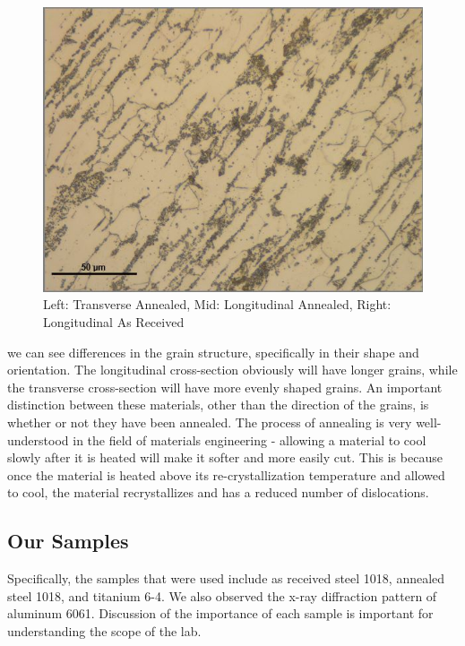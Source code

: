 \documentclass{article}
\begin{document}
\begin{figure}[h]
	\begin{minipage}{0.32\textwidth}
		\centering
		\includegraphics[scale=.28]{LongARSteel.png}
	\end{minipage}
	\caption{Left: Transverse Annealed, Mid: Longitudinal Annealed, Right: Longitudinal As Received}
\end{figure}

we can see differences in the grain structure, specifically in their shape and orientation. The longitudinal cross-section obviously will have longer grains, while the transverse cross-section will have more evenly shaped grains. An important distinction between these materials, other than the direction of the grains, is whether or not they have been annealed. The process of annealing is very well-understood in the field of materials engineering - allowing a material to cool slowly after it is heated will make it softer and more easily cut. This is because once the material is heated above its re-crystallization temperature and allowed to cool, the material recrystallizes and has a reduced number of dislocations.

\subsection{Our Samples}

Specifically, the samples that were used include as received steel 1018, annealed steel 1018, and titanium 6-4. We also observed the x-ray diffraction pattern of aluminum 6061. Discussion of the importance of each sample is important for understanding the scope of the lab.
\end{document}
